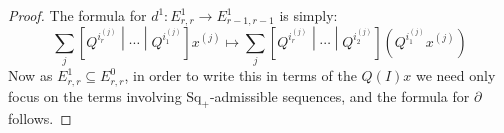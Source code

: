 \documentclass[10pt]{article}
\newcommand{\nontop}[1]{\ifblank{#1}{\scrU}{\scrU^{#1}}}
\newcommand{\Boverline}{\smash{\overline{B}}\rule{0mm}{\heightof{\ensuremath{B}}}}
\newcommand{\Koverline}{\smash{\overline{K}}\rule{0mm}{\heightof{\ensuremath{K}}}}
\newcommand{\Ind}[2][]{\ifblank{#1}{\mathbf{I}^{\smash{\mbox{\tiny $#2$}}}}{\mathbf{I}^{\mbox{\tiny $#2$}}_{#1}}}%
\newcommand{\derived}{\mathbb{L}}
\renewcommand{\Q}{Q}
\newcommand{\SqShift}{\Sq_{+}}
\newcommand{\Sq}{\mathrm{Sq}}
\begin{document}
\begin{KoszulComplexes_n>1}
\begin{proof}


The formula for $d^1:E^1_{r,r}\to E^1_{r-1,r-1}$ is simply:
\[\sum_j \left[\Q^{i_r^{(j)}}\middle|\cdots \middle|\Q^{i_1^{(j)}}\right]x^{(j)}
\mapsto
\sum_j \left[\Q^{i_r^{(j)}}\middle|\cdots \middle|\Q^{i_2^{(j)}}\right]\left(\Q^{i_1^{(j)}}x^{(j)}\right)\]
Now as $E^1_{r,r}\subseteq E^0_{r,r}$, in order to write this in terms of the $\Q(I)x$ we need only focus on the terms involving $\SqShift$-admissible sequences, and the formula for $\partial$ follows.
\end{proof}


\end{KoszulComplexes_n>1}
\end{document}

